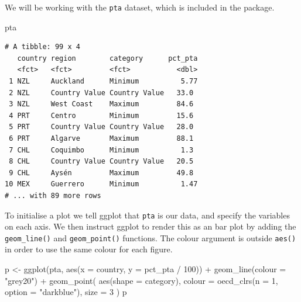 \documentclass[
  11pt,
  oneside]{report}
\newenvironment{Shaded}{\begin{snugshade}}{\end{snugshade}}
\newcommand{\AttributeTok}[1]{\textcolor[rgb]{0.77,0.63,0.00}{#1}}
\newcommand{\DecValTok}[1]{\textcolor[rgb]{0.00,0.00,0.81}{#1}}
\newcommand{\FunctionTok}[1]{\textcolor[rgb]{0.00,0.00,0.00}{#1}}
\newcommand{\NormalTok}[1]{#1}
\newcommand{\OtherTok}[1]{\textcolor[rgb]{0.56,0.35,0.01}{#1}}
\newcommand{\SpecialCharTok}[1]{\textcolor[rgb]{0.00,0.00,0.00}{#1}}
\newcommand{\StringTok}[1]{\textcolor[rgb]{0.31,0.60,0.02}{#1}}
\begin{document}
We will be working with the \texttt{pta} dataset, which is included in
the package.

\begin{Shaded}
\begin{Highlighting}[]
\NormalTok{pta}
\end{Highlighting}
\end{Shaded}

\begin{verbatim}
# A tibble: 99 x 4
   country region        category      pct_pta
   <fct>   <fct>         <fct>           <dbl>
 1 NZL     Auckland      Minimum          5.77
 2 NZL     Country Value Country Value   33.0 
 3 NZL     West Coast    Maximum         84.6 
 4 PRT     Centro        Minimum         15.6 
 5 PRT     Country Value Country Value   28.0 
 6 PRT     Algarve       Maximum         88.1 
 7 CHL     Coquimbo      Minimum          1.3 
 8 CHL     Country Value Country Value   20.5 
 9 CHL     Aysén         Maximum         49.8 
10 MEX     Guerrero      Minimum          1.47
# ... with 89 more rows
\end{verbatim}

To initialise a plot we tell ggplot that \texttt{pta} is our data, and
specify the variables on each axis. We then instruct ggplot to render
this as an bar plot by adding the \texttt{geom\_line()} and
\texttt{geom\_point()} functions. The colour argument is outside
\texttt{aes()} in order to use the same colour for each figure.

\begin{Shaded}
\begin{Highlighting}[]
\NormalTok{p }\OtherTok{\textless{}{-}} \FunctionTok{ggplot}\NormalTok{(pta, }\FunctionTok{aes}\NormalTok{(}\AttributeTok{x =}\NormalTok{ country, }\AttributeTok{y =}\NormalTok{ pct\_pta }\SpecialCharTok{/} \DecValTok{100}\NormalTok{)) }\SpecialCharTok{+}
  \FunctionTok{geom\_line}\NormalTok{(}\AttributeTok{colour =} \StringTok{"grey20"}\NormalTok{) }\SpecialCharTok{+}
  \FunctionTok{geom\_point}\NormalTok{(}
    \FunctionTok{aes}\NormalTok{(}\AttributeTok{shape =}\NormalTok{ category),}
    \AttributeTok{colour =} \FunctionTok{oecd\_clrs}\NormalTok{(}\AttributeTok{n =} \DecValTok{1}\NormalTok{, }\AttributeTok{option =} \StringTok{"darkblue"}\NormalTok{),}
    \AttributeTok{size =} \DecValTok{3}
\NormalTok{  )}
\NormalTok{p}
\end{Highlighting}
\end{Shaded}
\end{document}
